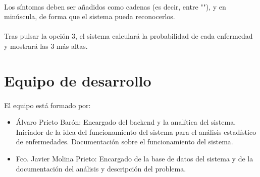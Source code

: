 \documentclass{article}
\begin{document}
    \paragraph{}
    Los síntomas deben ser añadidos como cadenas (es decir, entre ""), y en minúscula, de forma que el sistema pueda reconocerlos.
    \paragraph{}
    Tras pulsar la opción 3, el sistema calculará la probabilidad de cada enfermedad y mostrará las 3 más altas.
    \pagebreak
    \section{Equipo de desarrollo} 
    \paragraph{}
    El equipo está formado por:
    \begin{itemize}
        \item Álvaro Prieto Barón: Encargado del backend y la analítica del sistema. Iniciador de la idea del funcionamiento del sistema para el análisis estadístico de enfermedades. Documentación sobre el funcionamiento del sistema.
        \item Fco. Javier Molina Prieto: Encargado de la base de datos del sistema y de la documentación del análisis y descripción del problema. 
    \end{itemize}
\end{document}
